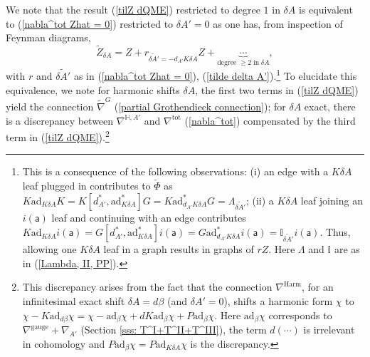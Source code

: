 \documentclass[11pt,a4paper]{amsart}
\theoremstyle{plain} %
\theoremstyle{definition}
\theoremstyle{remark}
\newcommand{\HH}{\mathbb{H}}
\newcommand{\mr}{\mathrm}
\newcommand{\sfa}{\mathsf{a}}
\newcommand{\til}{\widetilde}
\newcommand{\ad}{\mathrm{ad}}
\begin{document}
{We note that the result (\ref{tilZ dQME}) restricted to degree $1$ in $\delta A$ is equivalent to (\ref{nabla^tot Zhat = 0}) restricted to $\delta A'=0$ as one has, from inspection of Feynman diagrams,
\begin{equation}
    \til{Z}_{\delta A}=Z+r_{\til{\delta A'}=-d_{A'}K\delta A}Z+\underbrace{\cdots}_{\mr{degree}\;\geq 2\;\mr{in}\;\delta A},
\end{equation}
with $r$ and $\til{\delta A'}$ as in (\ref{nabla^tot Zhat = 0}), (\ref{tilde delta A'}).\footnote{
This is a consequence of the following observations: (i) an edge with a $K\delta A$ leaf plugged in contributes to $\check\Phi$ as $K\ad_{K\delta A} K=K[d^*_{A'},\ad^*_{K\delta A}]G= K \ad^*_{d_{A'}K\delta A}G = \Lambda_{\til{\delta A'}}$; (ii) a $K\delta A$ leaf joining an $i(\sfa)$ leaf and continuing with an edge contributes $K\ad_{K\delta A}i(\sfa)=G[d^*_{A'},\ad^*_{K\delta A}]i(\sfa)=G\ad^*_{d_{A'}K\delta A}i(\sfa)=\mathbb{I}_{\til{\delta A'}}i(\sfa)$. Thus, allowing one $K\delta A$ leaf in a graph results in graphs of $rZ$. Here $\Lambda$ and $\mathbb{I}$ are as in (\ref{Lambda, II, PP}).
}
To elucidate this equivalence, we note for harmonic shifts $\delta A$, the first two terms in (\ref{tilZ dQME}) yield the connection $\til\nabla^G$ (\ref{partial Grothendieck connection}); for $\delta A$ exact, there is a discrepancy between $\nabla^{\HH,A'}$ and $\nabla^\mr{tot}$ (\ref{nabla^tot}) compensated by the third term in (\ref{tilZ dQME}).\footnote{This discrepancy arises from the fact that the connection $\nabla^\mr{Harm}$, for an infinitesimal exact shift $\delta A= d\beta$ (and $\delta A'=0$), shifts a harmonic form $\chi$ to $\chi-K\ad_{d\beta}\chi= \chi-\ad_\beta\chi+dK\ad_\beta \chi + P\ad_\beta\chi$. Here $\ad_\beta\chi$ corresponds to $\nabla^\mr{gauge}+\nabla_{A'}$ (Section \ref{sss: T^I+T^II+T^III}), the term $d(\cdots)$ is irrelevant in cohomology and $P\ad_\beta\chi=P\ad_{K\delta A}\chi$ is the discrepancy.
} 






}
\end{document}
